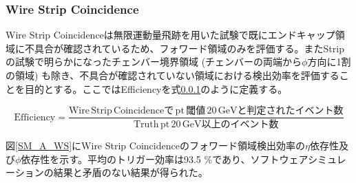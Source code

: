 \subsubsection{Wire Strip Coincidence}
Wire Strip Coincidenceは無限運動量飛跡を用いた試験で既にエンドキャップ領域に不具合が確認されているため、フォワード領域のみを評価する。またStripの試験で明らかになったチェンバー境界領域 (チェンバーの両端から$\phi$方向に1割の領域) も除き、不具合が確認されていない領域における検出効率を評価することを目的とする。ここではEfficiencyを式\ref{}のように定義する。

\begin{equation}
    \mathrm {Efficiency} = \frac{\mathrm{Wire\,Strip\, Coincidenceで\,pt \,閾値\,20\,GeVと判定されたイベント数}}{\mathrm{Truth\,pt \,20 \,GeV以上のイベント数}}
    \label{eq:WS_Efficiency}
\end{equation}

図\ref{SM_A_WS}にWire Strip Coincidenceのフォワード領域検出効率の$\eta$依存性及び$\phi$依存性を示す。平均のトリガー効率は93.5 \%であり、ソフトウェアシミュレーションの結果と矛盾のない結果が得られた。


